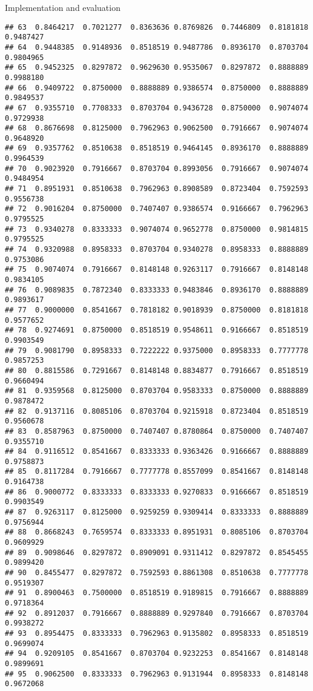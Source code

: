 \documentclass[
  ignorenonframetext,
]{beamer}
\begin{document}
\begin{frame}[fragile]{Implementation and evaluation}
\begin{verbatim}
## 63  0.8464217  0.7021277  0.8363636 0.8769826  0.7446809  0.8181818 0.9487427
## 64  0.9448385  0.9148936  0.8518519 0.9487786  0.8936170  0.8703704 0.9804965
## 65  0.9452325  0.8297872  0.9629630 0.9535067  0.8297872  0.8888889 0.9988180
## 66  0.9409722  0.8750000  0.8888889 0.9386574  0.8750000  0.8888889 0.9849537
## 67  0.9355710  0.7708333  0.8703704 0.9436728  0.8750000  0.9074074 0.9729938
## 68  0.8676698  0.8125000  0.7962963 0.9062500  0.7916667  0.9074074 0.9648920
## 69  0.9357762  0.8510638  0.8518519 0.9464145  0.8936170  0.8888889 0.9964539
## 70  0.9023920  0.7916667  0.8703704 0.8993056  0.7916667  0.9074074 0.9484954
## 71  0.8951931  0.8510638  0.7962963 0.8908589  0.8723404  0.7592593 0.9556738
## 72  0.9016204  0.8750000  0.7407407 0.9386574  0.9166667  0.7962963 0.9795525
## 73  0.9340278  0.8333333  0.9074074 0.9652778  0.8750000  0.9814815 0.9795525
## 74  0.9320988  0.8958333  0.8703704 0.9340278  0.8958333  0.8888889 0.9753086
## 75  0.9074074  0.7916667  0.8148148 0.9263117  0.7916667  0.8148148 0.9834105
## 76  0.9089835  0.7872340  0.8333333 0.9483846  0.8936170  0.8888889 0.9893617
## 77  0.9000000  0.8541667  0.7818182 0.9018939  0.8750000  0.8181818 0.9577652
## 78  0.9274691  0.8750000  0.8518519 0.9548611  0.9166667  0.8518519 0.9903549
## 79  0.9081790  0.8958333  0.7222222 0.9375000  0.8958333  0.7777778 0.9857253
## 80  0.8815586  0.7291667  0.8148148 0.8834877  0.7916667  0.8518519 0.9660494
## 81  0.9359568  0.8125000  0.8703704 0.9583333  0.8750000  0.8888889 0.9878472
## 82  0.9137116  0.8085106  0.8703704 0.9215918  0.8723404  0.8518519 0.9560678
## 83  0.8587963  0.8750000  0.7407407 0.8780864  0.8750000  0.7407407 0.9355710
## 84  0.9116512  0.8541667  0.8333333 0.9363426  0.9166667  0.8888889 0.9758873
## 85  0.8117284  0.7916667  0.7777778 0.8557099  0.8541667  0.8148148 0.9164738
## 86  0.9000772  0.8333333  0.8333333 0.9270833  0.9166667  0.8518519 0.9903549
## 87  0.9263117  0.8125000  0.9259259 0.9309414  0.8333333  0.8888889 0.9756944
## 88  0.8668243  0.7659574  0.8333333 0.8951931  0.8085106  0.8703704 0.9609929
## 89  0.9098646  0.8297872  0.8909091 0.9311412  0.8297872  0.8545455 0.9899420
## 90  0.8455477  0.8297872  0.7592593 0.8861308  0.8510638  0.7777778 0.9519307
## 91  0.8900463  0.7500000  0.8518519 0.9189815  0.7916667  0.8888889 0.9718364
## 92  0.8912037  0.7916667  0.8888889 0.9297840  0.7916667  0.8703704 0.9938272
## 93  0.8954475  0.8333333  0.7962963 0.9135802  0.8958333  0.8518519 0.9699074
## 94  0.9209105  0.8541667  0.8703704 0.9232253  0.8541667  0.8148148 0.9899691
## 95  0.9062500  0.8333333  0.7962963 0.9131944  0.8958333  0.8148148 0.9672068

\end{verbatim}
\end{frame}
\end{document}
